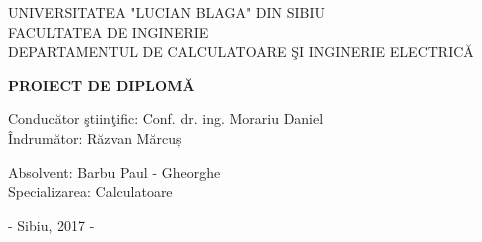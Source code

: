 \documentclass[12pt,a4paper,titlepage]{report}
\author{Barbu Paul - Gheorghe}
\begin{document}
\begin{titlepage}
{
\centering
UNIVERSITATEA "LUCIAN BLAGA" DIN SIBIU\\
FACULTATEA DE INGINERIE \\
DEPARTAMENTUL DE CALCULATOARE ŞI INGINERIE ELECTRICĂ\\
}

\vfill
\vspace{150px}
{
\centering
\begin{center}
\Huge
\textbf{PROIECT DE DIPLOMĂ}
\end{center}

}

\vfill
{
\raggedright
Conducător ştiinţific: Conf. dr. ing. Morariu Daniel \\
Îndrumător: Răzvan Mărcuș
}
\vfill

{
\raggedright
\hspace*{270pt}Absolvent: Barbu Paul - Gheorghe\\
\hspace*{270pt}Specializarea: Calculatoare
}
\vfill

{
\begin{center}
- Sibiu, 2017 -
\end{center}
}
\end{titlepage}
\end{document}
